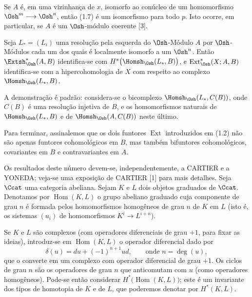  Se $A$ é, em uma vizinhança de $x$, isomorfo ao
conúcleo de um homomorfismo $\Osh^{m}\longrightarrow\Osh^{n}$, então (1.7) é um
isomorfismo para todo $p$. Isto ocorre, em
particular, se $A$ é um $\Osh$-módulo coerente [3].

 Seja $L_{*}=(L_i)$ uma resolução pela esquerda do
$\Osh$-Módulo $A$ por $\Osh$-Módulos cada um dos quais é localmente isomorfo a
um $\Osh^{n}$. Então $\Extsh_{\Osh}^{*}(A,B)$ identifica-se com
$H^{*}\bigl(\Homsh_{\Osh}(L_{*},B)\bigr)$, e
$\operatorname{Ext}_{\Osh}^{*}(X;A,B)$ identifica-se com a hipercohomologia de $X$
com respeito ao complexo $\Homsh_{\Osh}(L_{*},B)$.

A demonstração é padrão: considera-se o bicomplexo
$\Homsh_{\Osh}(L_{*},C(B))$, onde $C(B)$ é uma resolução injetiva de $B$, e os
homomorfismos naturais de $\Homsh_{\Osh}(L_{*},B)$ e de
$\Homsh_{\Osh}(A,C(B))$ neste último.

Para terminar, assinalemos que os dois funtores $\operatorname{Ext}$ introduzidos
em (1.2) não são apenas funtores cohomológicos em $B$, mas também
bifuntores cohomológicos, covariantes em $B$ e contravariantes em $A$.


Os resultados deste número devem-se, independentemente, a CARTIER e a YONEDA; veja-se
uma exposição de CARTIER [1] para mais detalhes. Seja $\Ccat$ uma categoria abeliana.
Sejam $K$ e $L$ dois objetos graduados de $\Ccat$. Denotamos por
$\operatorname{Hom}(K,L)$ o grupo abeliano graduado cuja componente de grau
$n$ é formada pelos homomorfismos homogêneos de grau $n$ de $K$ em $L$ (isto é,
os sistemas $(u_i)$ de homomorfismos $K^{i}\longrightarrow L^{i+n}$).

Se $K$ e $L$ são complexos (com operadores diferenciais de grau $+1$, para
fixar as ideias), introduz-se em $\operatorname{Hom}(K,L)$ o operador
diferencial dado por
\begin{equation}\tag{2.1}
  \delta(u)=du+(-1)^{n+1}ud,\qquad\text{onde }n=\deg(u),
\end{equation}
que o converte em um complexo com operador diferencial de grau $+1$. Os ciclos de
grau $n$ são os operadores de grau $n$ que anticomutam com $u$ (como
operadores homogêneos). Pode-se então considerar
$H^{*}\bigl(\operatorname{Hom}(K,L)\bigr)$; este é um invariante dos tipos
de homotopia de $K$ e de $L$, que poderemos denotar por $H^{*}(K,L)$.

